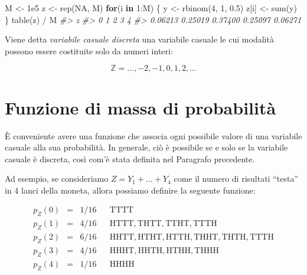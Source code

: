 \documentclass[
  11pt,
]{krantz}
\makeatletter
\newenvironment{Shaded}{\begin{snugshade}}{\end{snugshade}}
\newcommand{\CommentTok}[1]{\textcolor[rgb]{0.37,0.37,0.37}{\textit{#1}}}
\newcommand{\ConstantTok}[1]{\textcolor[rgb]{0,0,0}{#1}}
\newcommand{\ControlFlowTok}[1]{\textcolor[rgb]{0.27,0.27,0.27}{\textbf{#1}}}
\newcommand{\DecValTok}[1]{\textcolor[rgb]{0.06,0.06,0.06}{#1}}
\newcommand{\FloatTok}[1]{\textcolor[rgb]{0.06,0.06,0.06}{#1}}
\newcommand{\FunctionTok}[1]{\textcolor[rgb]{0,0,0}{#1}}
\newcommand{\NormalTok}[1]{#1}
\newcommand{\OtherTok}[1]{\textcolor[rgb]{0.37,0.37,0.37}{#1}}
\newcommand{\SpecialCharTok}[1]{\textcolor[rgb]{0,0,0}{#1}}
\newenvironment{kframe}{%
\medskip{}
\setlength{\fboxsep}{.8em}
 \def\at@end@of@kframe{}%
 \ifinner\ifhmode%
  \def\at@end@of@kframe{\end{minipage}}%
  \begin{minipage}{\columnwidth}%
 \fi\fi%
 \def\FrameCommand##1{\hskip\@totalleftmargin \hskip-\fboxsep
 \colorbox{shadecolor}{##1}\hskip-\fboxsep
     \hskip-\linewidth \hskip-\@totalleftmargin \hskip\columnwidth}%
 \MakeFramed {\advance\hsize-\width
   \@totalleftmargin\z@ \linewidth\hsize
   \@setminipage}}%
 {\par\unskip\endMakeFramed%
 \at@end@of@kframe}
\renewenvironment{Shaded}{\begin{kframe}}{\end{kframe}}
\theoremstyle{definition}
\theoremstyle{definition}
\theoremstyle{definition}
\theoremstyle{definition}
\theoremstyle{remark}
\makeatother
\begin{document}
\begin{Shaded}
\begin{Highlighting}[]
\NormalTok{M }\OtherTok{\textless{}{-}} \FloatTok{1e5}
\NormalTok{z }\OtherTok{\textless{}{-}} \FunctionTok{rep}\NormalTok{(}\ConstantTok{NA}\NormalTok{, M)}
\ControlFlowTok{for}\NormalTok{(i }\ControlFlowTok{in} \DecValTok{1}\SpecialCharTok{:}\NormalTok{M) \{}
\NormalTok{  y }\OtherTok{\textless{}{-}} \FunctionTok{rbinom}\NormalTok{(}\DecValTok{4}\NormalTok{, }\DecValTok{1}\NormalTok{, }\FloatTok{0.5}\NormalTok{)}
\NormalTok{  z[i] }\OtherTok{\textless{}{-}} \FunctionTok{sum}\NormalTok{(y)}
\NormalTok{\}}
\FunctionTok{table}\NormalTok{(z) }\SpecialCharTok{/}\NormalTok{ M}
\CommentTok{\#\textgreater{} z}
\CommentTok{\#\textgreater{}       0       1       2       3       4 }
\CommentTok{\#\textgreater{} 0.06213 0.25019 0.37400 0.25097 0.06271}
\end{Highlighting}
\end{Shaded}

Viene detta \emph{variabile casuale discreta} una variabile casuale le cui modalità possono essere costituite solo da numeri interi:

\[
\mathbb{Z} = \dots, -2, -1, 0, 1, 2, \dots
\]

\hypertarget{sec:fun-mass-prob}{%
\section{Funzione di massa di probabilità}\label{sec:fun-mass-prob}}

È conveniente avere una funzione che associa ogni possibile valore di una variabile casuale alla sua probabilità. In generale, ciò è possibile se e solo se la variabile casuale è discreta, così com'è stata definita nel Paragrafo precedente.

Ad esempio, se consideriamo \(Z = Y_1 + \dots + Y_4\) come il numero di risultati ``testa'' in 4 lanci della moneta, allora possiamo definire la seguente funzione:

\[
\begin{array}{rclll}
p_Z(0) & = & 1/16 & & \mathrm{TTTT}
\\
p_Z(1) & = & 4/16 & & \mathrm{HTTT, THTT, TTHT, TTTH}
\\
p_Z(2) & = & 6/16 & & \mathrm{HHTT, HTHT, HTTH, THHT, THTH, TTTH}
\\
p_Z(3) & = & 4/16 & & \mathrm{HHHT, HHTH, HTHH, THHH}
\\
p_Z(4) & = & 1/16 & & \mathrm{HHHH}
\end{array}
\]
\end{document}
